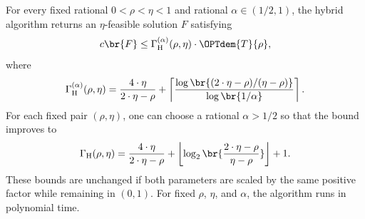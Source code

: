 \begin{theorem}\label{thm:tree-hybrid-recursion}
    For every fixed rational $0<\rho<\eta<1$ and rational $\alpha\in(1/2,1)$, the hybrid algorithm returns an $\eta$-feasible solution $F$ satisfying
    \[
        c\br{F}
        \leq
        \Gamma_{\mathrm{H}}^{(\alpha)}(\rho,\eta)\cdot\OPTdem{T}{\rho},
    \]
    where
    \begin{equation}\label{eq:tree-hybrid-ratio}
        \Gamma_{\mathrm{H}}^{(\alpha)}(\rho,\eta)
        =
        \frac{4\cdot\eta}{2\cdot\eta-\rho}
        +
        \left\lceil
            \frac{
                \log\br{(2\cdot\eta-\rho)/(\eta-\rho)}
            }{
                \log\br{1/\alpha}
            }
        \right\rceil.
    \end{equation}
    For each fixed pair $(\rho,\eta)$, one can choose a rational $\alpha>1/2$ so that the bound improves to
    \begin{equation}\label{eq:tree-hybrid-best-ratio}
        \Gamma_{\mathrm{H}}(\rho,\eta)
        =
        \frac{4\cdot\eta}{2\cdot\eta-\rho}
        +
        \left\lfloor
            \log_2\br{\frac{2\cdot\eta-\rho}{\eta-\rho}}
        \right\rfloor+1.
    \end{equation}
    These bounds are unchanged if both parameters are scaled by the same positive factor while remaining in $(0,1)$. For fixed $\rho$, $\eta$, and $\alpha$, the algorithm runs in polynomial time.
\end{theorem}
